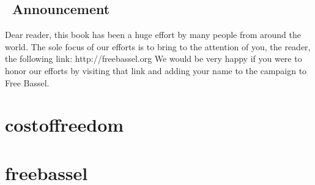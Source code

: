 \subsection{~Announcement}\label{announcement}

Dear reader, this book has been a huge effort by many people from around
the world. The sole focus of our efforts is to bring to the attention of
you, the reader, the following link: http://freebassel.org We would be
very happy if you were to honor our efforts by visiting that link and
adding your name to the campaign to Free Bassel.

\section{costoffreedom}\label{costoffreedom}

\section{freebassel}\label{freebassel}
